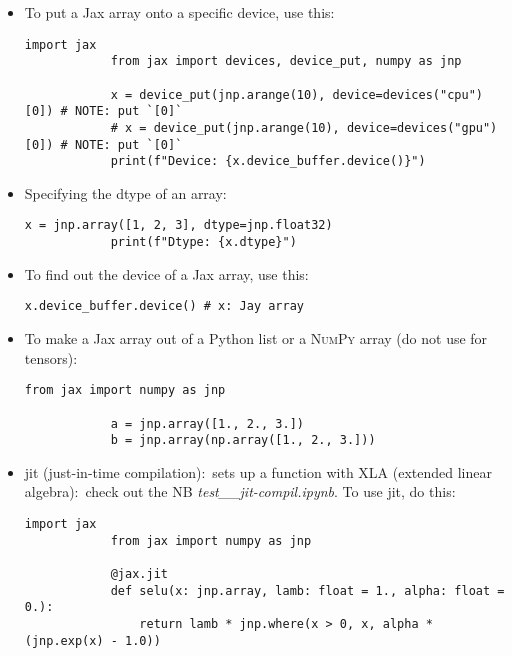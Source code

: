 \documentclass[12pt, a4paper]{article}
\numberwithin{equation}{section}
\theoremstyle{definition}
\theoremstyle{definition}
\begin{document}
	\begin{itemize}
		\item To put a Jax array onto a specific device, use this: 
		
		\begin{lstlisting}[style=mystylepython, label=alg:jax_device, caption=Device specification in Jax, xleftmargin=\parindent]
			import jax
			from jax import devices, device_put, numpy as jnp
			
			x = device_put(jnp.arange(10), device=devices("cpu")[0]) # NOTE: put `[0]`
			# x = device_put(jnp.arange(10), device=devices("gpu")[0]) # NOTE: put `[0]`
			print(f"Device: {x.device_buffer.device()}")
		\end{lstlisting}
		
		\item Specifying the dtype of an array: 
		
		\begin{lstlisting}[style=mystylepython, label=alg:jax_dtype, caption=Jax device retrieval, xleftmargin=\parindent]
			x = jnp.array([1, 2, 3], dtype=jnp.float32)
			print(f"Dtype: {x.dtype}")
		\end{lstlisting}
	
		\item To find out the device of a Jax array, use this:
		
		\begin{lstlisting}[style=mystylepython, label=alg:jax__dev_retrieval, caption=Jax device retrieval, xleftmargin=\parindent]
			x.device_buffer.device() # x: Jay array
		\end{lstlisting}
	
		\item To make a Jax array out of a Python list or a \textsc{NumPy} array  (do not use for \textsc{} tensors): 
		
		\begin{lstlisting}[style=mystylepython, label=alg:jax_array_crea, caption=Jax array creation, xleftmargin=\parindent]
			from jax import numpy as jnp
			
			a = jnp.array([1., 2., 3.])
			b = jnp.array(np.array([1., 2., 3.]))
		\end{lstlisting}

		\item jit (just-in-time compilation):~sets up a function with XLA (extended linear algebra):~check out the NB \textit{test\_\_jit-compil.ipynb}. To use jit, do this: 
		
		\begin{lstlisting}[style=mystylepython, label=alg:jax_jit, caption=Jax array, xleftmargin=\parindent]
			import jax
			from jax import numpy as jnp
			
			@jax.jit
			def selu(x: jnp.array, lamb: float = 1., alpha: float = 0.): 
				return lamb * jnp.where(x > 0, x, alpha * (jnp.exp(x) - 1.0))
		\end{lstlisting}
	\end{itemize}
\end{document}
